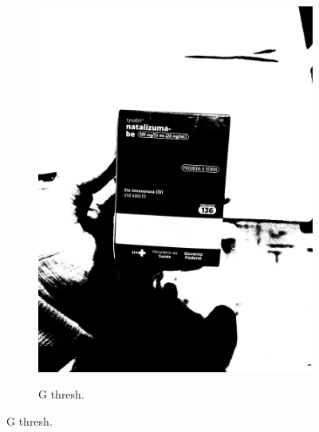 \begin{figure}[htb]
\begin{subfigure}[t]{0.21\textwidth}
        \includegraphics[width=\linewidth]{../pictures/tysabri_rgb_r_only_thresh.jpg}
    \end{subfigure}
    \hfill
    \begin{subfigure}[t]{0.21\textwidth}
        \centering
        \caption{G thresh.}
        \label{fig:foto:versoes:1:G_thresh}

\end{subfigure}
\end{figure}
